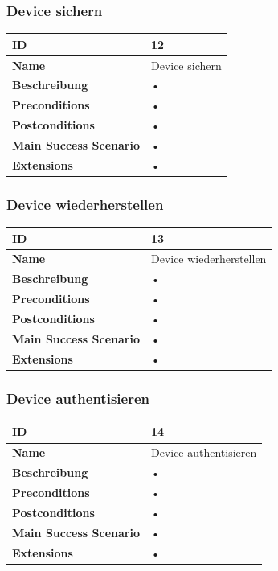 \subsubsection{Device sichern}
\mbox{}
\begin{longtable}{| p{4cm} | p{11.7cm} |}
 \hline
 \textbf{ID} & 12\\ \hline 
 \textbf{Name} & Device sichern\\ \hline 
 \textbf{Beschreibung} & • \\ \hline 
 \textbf{Preconditions} & • \\ \hline 
 \textbf{Postconditions} & • \\ \hline 
 \textbf{Main Success Scenario} & • \\ \hline 
 \textbf{Extensions} & • \\ \hline 
 \end{longtable}
 
\subsubsection{Device wiederherstellen}
\mbox{}
\begin{longtable}{| p{4cm} | p{11.7cm} |}
 \hline
 \textbf{ID} & 13\\ \hline 
 \textbf{Name} & Device wiederherstellen\\ \hline 
 \textbf{Beschreibung} & • \\ \hline 
 \textbf{Preconditions} & • \\ \hline 
 \textbf{Postconditions} & • \\ \hline 
 \textbf{Main Success Scenario} & • \\ \hline 
 \textbf{Extensions} & • \\ \hline 
 \end{longtable}
 
\subsubsection{Device authentisieren}
\mbox{}
\begin{longtable}{| p{4cm} | p{11.7cm} |}
 \hline
 \textbf{ID} & 14\\ \hline 
 \textbf{Name} & Device authentisieren\\ \hline 
 \textbf{Beschreibung} & • \\ \hline 
 \textbf{Preconditions} & • \\ \hline 
 \textbf{Postconditions} & • \\ \hline 
 \textbf{Main Success Scenario} & • \\ \hline 
 \textbf{Extensions} & • \\ \hline 
 \end{longtable}
 
